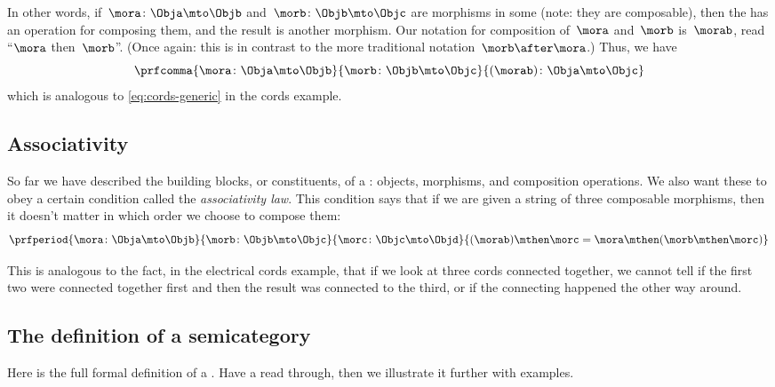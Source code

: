 In other words, if~$\mora\colon \Obja \mto \Objb$ and~$\morb\colon \Objb \mto \Objc$ are morphisms in some  (note: they are composable), then the  has an operation for composing them, and the result is another morphism.
Our notation for composition of~$\mora$ and~$\morb$ is~$\morab$, read ``$\mora$ then~$\morb$''.
(Once again: this is in contrast to the more traditional notation~$\morb \after \mora$.)
Thus, we have
\begin{equation}
    \prfcomma{
        \mora \colon \Obja \mto \Objb
    }{
        \morb\colon \Objb \mto \Objc
    }{
        (\morab )\colon \Obja \mto \Objc
    }
\end{equation}
which is analogous to \cref{eq:cords-generic} in the cords example.

\subsection{Associativity}

So far we have described the building blocks, or constituents, of a : objects, morphisms, and composition operations.
We also want these to obey a certain condition called the \emph{associativity law}.
This condition says that if we are given a string of three composable morphisms, then it doesn't matter in which order we choose to compose them:
\begin{equation}
    \prfperiod{
        \mora \colon \Obja \mto \Objb
    }{
        \morb\colon \Objb \mto \Objc
    }{
        \morc \colon \Objc \mto \Objd
    }{
        (\morab ) \mthen \morc = \mora \mthen ( \morb \mthen \morc )
    }
\end{equation}

This is analogous to the fact, in the electrical cords example, that if we look at three cords connected together, we cannot tell if the first two were connected together first and then the result was connected to the third, or if the connecting happened the other way around.

\subsection{The definition of a semicategory}

Here is the full formal definition of a .
Have a read through, then we illustrate it further with examples.

